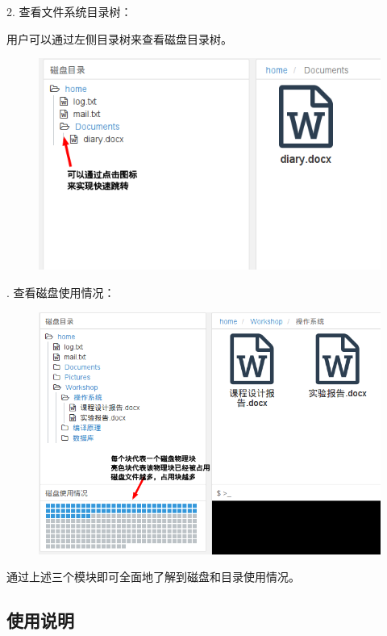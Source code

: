 \documentclass[12bp]{guo}
\begin{document}
2. 查看文件系统目录树：

用户可以通过左侧目录树来查看磁盘目录树。

\begin{figure}[h!]
    \centering
        \includegraphics[scale=0.75]{figures/fs-app.tree.png}
\end{figure}


. 查看磁盘使用情况：

\begin{figure}[h!]
    \centering
        \includegraphics[scale=0.75]{figures/fs-app.disk.png}
\end{figure}


通过上述三个模块即可全面地了解到磁盘和目录使用情况。

\subsection{使用说明}
\end{document}
